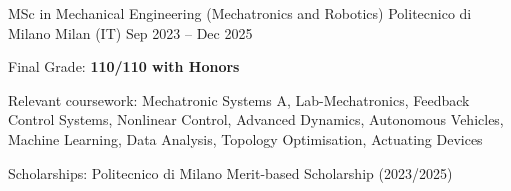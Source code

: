 
\cventry
{MSc in Mechanical Engineering (Mechatronics and Robotics)}
{Politecnico di Milano}
{Milan (IT)}
{Sep 2023 -- Dec 2025}
{
    \begin{cvitems}
        \item {Final Grade: \textbf{110/110 with Honors}}
        \item {Relevant coursework: Mechatronic Systems A, Lab-Mechatronics, Feedback Control Systems, Nonlinear Control, Advanced Dynamics, Autonomous Vehicles, Machine Learning, Data Analysis, Topology Optimisation, Actuating Devices}
        \item {Scholarships: Politecnico di Milano Merit-based Scholarship (2023/2025)}
    \end{cvitems}
}